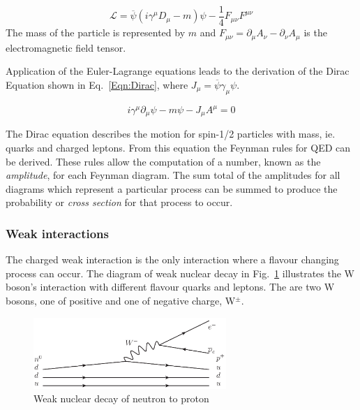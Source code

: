 \begin{equation}
\mathcal{L} = \overline{\psi}\left(i\gamma^{\mu}D_{\mu}-m\right)\psi - \frac{1}{4}F_{\mu\nu}F^{\mu\nu}
\label{eqn:QEDL}
\end{equation}
 The mass of the particle is represented by $m$ and $F_{\mu\nu} = \partial_{\mu}A_{\nu} - \partial_{\nu}A_{\mu}$ is the electromagnetic field tensor.

Application of the Euler-Lagrange equations leads to the derivation of the Dirac Equation shown in Eq.~\ref{Eqn:Dirac}, where $J_{\mu} = \overline{\psi}\gamma_{\mu}\psi$.

\begin{equation}
i\gamma ^{\mu }\partial _{\mu }\psi -m\psi - J_{\mu}A^{\mu} = 0
\label{Eqn:Dirac}
\end{equation}

The Dirac equation describes the motion for spin-1/2 particles with mass, ie. quarks and charged leptons. From this equation the Feynman rules for QED can be derived. These rules allow the computation of a number, known as the \emph{amplitude}, for each Feynman diagram. The sum total of the amplitudes for all diagrams which represent a particular process can be summed to produce the probability or \emph{cross section} for that process to occur.



\subsubsection{Weak interactions}

The charged weak interaction is the only interaction where a flavour changing process can occur. The diagram of weak nuclear decay in Fig.~\ref{fig:QEDvertex} illustrates the W boson's interaction with different flavour quarks and leptons. The are two W bosons, one of positive and one of negative charge, W$^{\pm}$.


\begin{figure}[ht!]
\begin{center}
    \includegraphics[width=0.65\textwidth]{images/Theory/weakDecay.png}
    \caption{Weak nuclear decay of neutron to proton}
    \label{fig:QEDvertex}
\end{center}
\end{figure}

